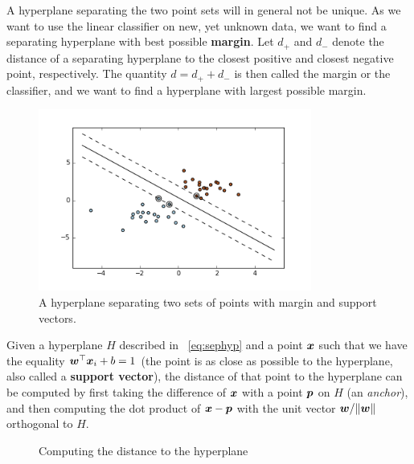 A hyperplane separating the two point sets will in general not be unique.
As we want to use the linear classifier on new, yet unknown data, we want to find a separating hyperplane with best possible \textbf{margin}. Let $d_+$ and $d_-$ denote the distance of a separating hyperplane to the closest positive and closest negative point, respectively. The quantity $d=d_++d_-$ is then called the margin or the classifier, and we want to find a hyperplane with largest possible margin.

\begin{figure}
\centering
\includegraphics[width=0.8\textwidth]{images/svm-linsep.png}
\caption{A hyperplane separating two sets of points with margin and support vectors.}
\end{figure}

Given a hyperplane $H$ described in ~\eqref{eq:sephyp} and a point $\bm{x}$ such that we have the equality $\bm{w}^{\top}\bm{x}_i+b=1$ (the point is as close as possible to the hyperplane, also called a \textbf{support vector}), the distance of that point to the hyperplane can be computed by first taking the difference of $\bm{x}$ with a point $\bm{p}$ on $H$ (an {\em anchor}), and then computing the dot product of $\bm{x}-\bm{p}$ with the unit vector $\bm{w}/\Vert {\bm{w}}\Vert$ orthogonal to $H$.

\begin{figure}
\centering
{}
\caption{Computing the distance to the hyperplane}
\end{figure}

